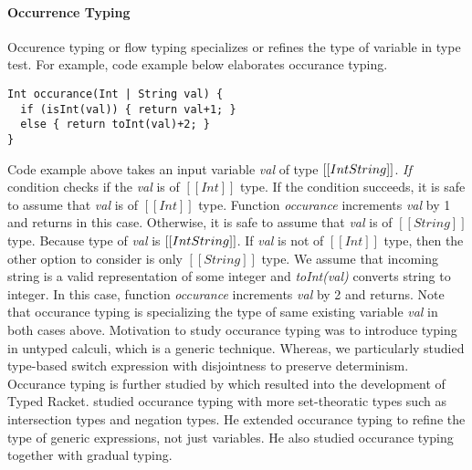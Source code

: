 \paragraph{Occurrence Typing}
Occurence typing or flow typing \cite{tobin2008design} specializes or refines 
the type of variable in type test. For example, code example below elaborates occurance typing.

\begin{lstlisting}
Int occurance(Int | String val) {
  if (isInt(val)) { return val+1; }
  else { return toInt(val)+2; }
}
\end{lstlisting}

\noindent Code example above takes an input variable \emph{val}
of type $[[Int \/ String]]$. 
\emph{If} condition checks if the \emph{val} is of $[[Int]]$ type.
If the condition succeeds, it is safe to assume that \emph{val} is of $[[Int]]$ type.
Function \emph{occurance} increments \emph{val} by 1 and returns in this case.
Otherwise, it is safe to assume that \emph{val} is of $[[String]]$ type.
Because type of \emph{val} is $[[Int \/ String]]$. If \emph{val} is not
of $[[Int]]$ type, then the other option to consider is only $[[String]]$ type.
We assume that incoming string is a valid representation of some integer
and \emph{toInt(val)} converts string to integer.
In this case, function \emph{occurance} increments \emph{val} by 2 and returns.
Note that occurance typing is specializing the type of
same existing variable \emph{val} in both cases above.
Motivation to study occurance typing was to introduce typing in untyped calculi,
which is a generic technique.
Whereas, we particularly studied type-based switch expression
with disjointness to preserve determinism.
Occurance typing is further studied by \cite{tobin2010logical}
which resulted into the development of Typed Racket.
\cite{castagna2019revisiting} studied occurance typing with more 
set-theoratic types such as intersection types and negation types.
He extended occurance typing to refine the type of
generic expressions, not just variables. He also studied occurance typing
together with gradual typing.


